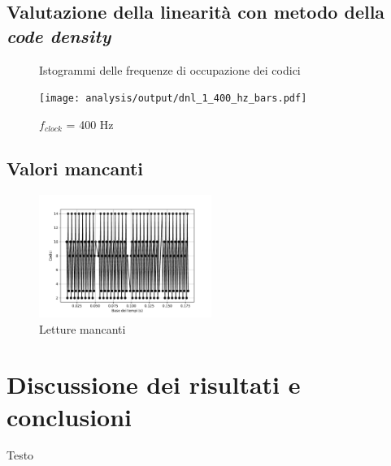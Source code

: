 \documentclass[journal]{IEEEtran}
\begin{document}
\subsection{Valutazione della linearità con metodo della \textit{code density}}

\begin{figure}[H]%
\begin{center}
\caption{Istogrammi delle frequenze di occupazione dei codici}
\texttt{[image: analysis/output/dnl\_1\_400\_hz\_bars.pdf]}
\caption{$f_{clock}$ = 400 Hz}
\label{fig:graph_dnl_800_hz}
\end{center}
\end{figure}


\subsection{Valori mancanti}

\begin{figure}[H]%
\begin{center}
\includegraphics[width=0.50\textwidth]{analysis/output/letture_mancanti.pdf}
\caption{Letture mancanti}
\label{fig:missing}
\end{center}
\end{figure}

\section{Discussione dei risultati e conclusioni}
Testo
\end{document}
